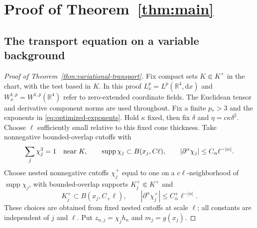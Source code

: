 \documentclass[11pt,a4paper]{article}
\numberwithin{equation}{section}
\newcommand{\supp}{\operatorname{supp}}
\newcommand{\dd}{\mathrm d}
\newcommand{\R}{\mathbb R}
\theoremstyle{definition}
\begin{document}
\section{Proof of Theorem~\ref{thm:main}}\label{sec:completion}

\subsection{The transport equation on a variable background}

\begin{proof}[Proof of Theorem~\ref{thm:variational-transport}]
Fix compact sets $K\Subset K^+$ in the chart, with the test based in
$K$. In this proof $L^p_x=L^p(\R^4,\dd x)$ and
$W^{1,p}_x=W^{1,p}(\R^4)$ refer to zero-extended coordinate fields.
The Euclidean tensor and derivative component norms are used throughout. Fix a finite $p_*>3$ and the exponents in
\eqref{eq:optimized-exponents}. Hold $\kappa$ fixed, then fix $\delta$ and
$\eta=c\kappa\delta^2$. Choose $\ell$ sufficiently small relative to
this fixed cone thickness. Take nonnegative
bounded-overlap cutoffs with
\begin{equation*}
\sum_j\chi_j^3=1\quad\hbox{near }K,\qquad
\supp\chi_j\subset B(x_j,C\ell),\qquad
|\partial^\alpha\chi_j|\leq C_\alpha\ell^{-|\alpha|}.
\end{equation*}
Choose nested nonnegative cutoffs $\chi_j^+$ equal to one on a
$c\ell$-neighborhood of $\supp\chi_j$, with bounded-overlap supports
$K_j^+\Subset K^+$ and
\begin{equation*}
K_j^+\subset B(x_j,C_+\ell),\qquad
|\partial^\alpha\chi_j^+|\leq C_\alpha^+\ell^{-|\alpha|}.
\end{equation*}
These choices are obtained from fixed nested cutoffs at scale $\ell$;
all constants are independent of $j$ and $\ell$. Put
$z_{n,j}=\chi_jh_n$ and $m_j=g(x_j)$.


\end{proof}
\end{document}
